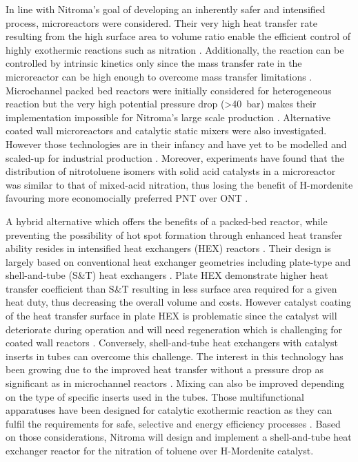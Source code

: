 In line with Nitroma's goal of developing an inherently safer and intensified process, microreactors were considered. Their very high heat transfer rate resulting from the high surface area to volume ratio enable the efficient control of highly exothermic reactions such as nitration \cite{halder_nitration_2007}. Additionally, the reaction can be controlled by intrinsic kinetics only since the mass transfer rate in the microreactor can be high enough to overcome mass transfer limitations \cite{halder_nitration_2007}. Microchannel packed bed reactors were initially considered for heterogeneous reaction but the very high potential pressure drop (\SI{>40}{\bar}) makes their implementation impossible for Nitroma's large scale production \cite{rebrov_microreactors_2016}. Alternative coated wall microreactors and catalytic static mixers were also investigated. However those technologies are in their infancy and have yet to be modelled and scaled-up for industrial production \cite{lopes_regime_2013}. Moreover, experiments have found that the distribution of nitrotoluene isomers with solid acid catalysts in a microreactor was similar to that of mixed-acid nitration, thus losing the benefit of H-mordenite favouring more economocially preferred PNT over ONT \cite{halder_nitration_2007}.


A hybrid alternative which offers the benefits of a packed-bed reactor, while preventing the possibility of hot spot formation through enhanced heat transfer ability resides in intensified heat exchangers (HEX) reactors \cite{di_miceli_raimondi_safety_2015}. Their design is largely based on conventional heat exchanger geometries including plate-type and shell-and-tube (S\&T) heat exchangers \cite{anxionnaz_heat_2008}. Plate HEX demonstrate higher heat transfer coefficient than S\&T resulting in less surface area required for a given heat duty, thus decreasing the overall volume and costs. However catalyst coating of the heat transfer surface in plate HEX is problematic since the catalyst will deteriorate during operation and will need regeneration which is challenging for coated wall reactors \cite{anxionnaz_heat_2008}. Conversely, shell-and-tube heat exchangers with catalyst inserts in tubes can overcome this challenge. The interest in this technology has been growing due to the improved heat transfer without a pressure drop as significant as in microchannel reactors \cite{griffin_heat_2001}. Mixing can also be improved depending on the type of specific inserts used in the tubes. Those multifunctional apparatuses have been designed for catalytic exothermic reaction as they can fulfil the requirements for safe, selective and energy efficiency processes \cite{anxionnaz_heat_2008}. Based on those considerations, Nitroma will design and implement a shell-and-tube heat exchanger reactor for the nitration of toluene over H-Mordenite catalyst.



